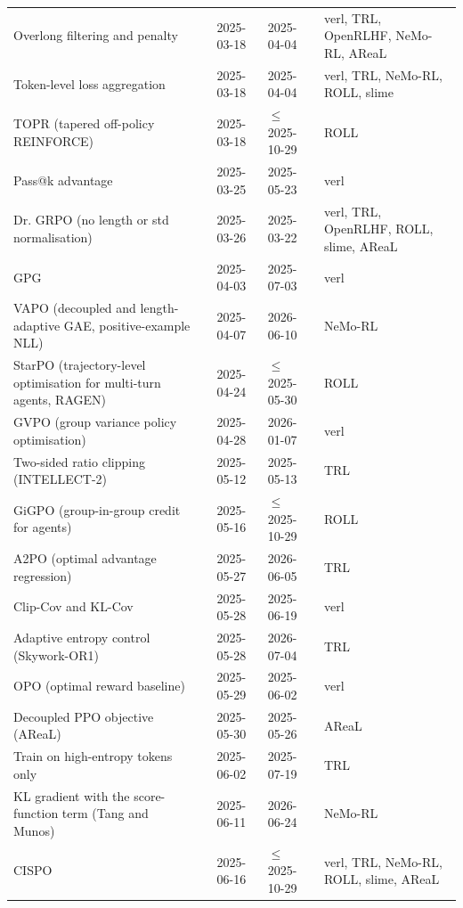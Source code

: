 \begin{longtable}{@{}>{\raggedright\arraybackslash}p{3.5cm} >{\raggedright\arraybackslash}p{2.3cm} l l >{\raggedright\arraybackslash}p{2.9cm}@{}}
Overlong filtering and penalty & \citet{arxiv250314476} & 2025-03-18 & 2025-04-04 & verl, TRL, OpenRLHF, NeMo-RL, AReaL \\
Token-level loss aggregation & \citet{arxiv250314476} & 2025-03-18 & 2025-04-04 & verl, TRL, NeMo-RL, ROLL, slime \\
TOPR (tapered off-policy REINFORCE) & \citet{arxiv250314286} & 2025-03-18 & $\le$2025-10-29 & ROLL \\
Pass@k advantage & \citet{arxiv250319595} & 2025-03-25 & 2025-05-23 & verl \\
Dr. GRPO (no length or std normalisation) & \citet{arxiv250320783} & 2025-03-26 & 2025-03-22 & verl, TRL, OpenRLHF, ROLL, slime, AReaL \\
GPG & \citet{arxiv250402546} & 2025-04-03 & 2025-07-03 & verl \\
VAPO (decoupled and length-adaptive GAE, positive-example NLL) & \citet{arxiv250405118} & 2025-04-07 & 2026-06-10 & NeMo-RL \\
StarPO (trajectory-level optimisation for multi-turn agents, RAGEN) & \citet{arxiv250420073} & 2025-04-24 & $\le$2025-05-30 & ROLL \\
GVPO (group variance policy optimisation) & \citet{arxiv250419599} & 2025-04-28 & 2026-01-07 & verl \\
Two-sided ratio clipping (INTELLECT-2) & \citet{arxiv250507291} & 2025-05-12 & 2025-05-13 & TRL \\
GiGPO (group-in-group credit for agents) & \citet{arxiv250510978} & 2025-05-16 & $\le$2025-10-29 & ROLL \\
A2PO (optimal advantage regression) & \citet{arxiv250520686} & 2025-05-27 & 2026-06-05 & TRL \\
Clip-Cov and KL-Cov & \citet{arxiv250522617} & 2025-05-28 & 2025-06-19 & verl \\
Adaptive entropy control (Skywork-OR1) & \citet{arxiv250522312} & 2025-05-28 & 2026-07-04 & TRL \\
OPO (optimal reward baseline) & \citet{arxiv250523585} & 2025-05-29 & 2025-06-02 & verl \\
Decoupled PPO objective (AReaL) & \citet{arxiv250524298} & 2025-05-30 & 2025-05-26 & AReaL \\
Train on high-entropy tokens only & \citet{arxiv250601939} & 2025-06-02 & 2025-07-19 & TRL \\
KL gradient with the score-function term (Tang and Munos) & \citet{arxiv250609477} & 2025-06-11 & 2026-06-24 & NeMo-RL \\
CISPO & \citet{arxiv250613585} & 2025-06-16 & $\le$2025-10-29 & verl, TRL, NeMo-RL, ROLL, slime, AReaL \\

\end{longtable}
